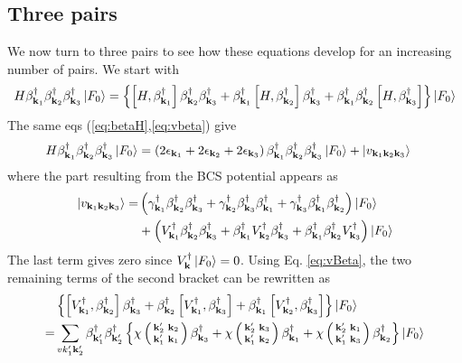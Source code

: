 \documentclass[aps,prb,amsmath,amssymb,preprint,superscriptaddress]{revtex4-1}
\newcommand{\fo}{\ensuremath{\ket{F_0}}}
\begin{document}
\subsection{Three pairs}
We now turn to three pairs to see how these equations develop for an increasing number of pairs. We start with 
\begin{equation}\label{eq:SchThree}
\begin{split}
H\beta^{\dagger}_{\vk_1}\beta^{\dagger}_{\vk_2}\beta^{\dagger}_{\vk_3}\fo
&=\bbr{\com{H}{\beta^{\dagger}_{\vk_1}}\beta^{\dagger}_{\vk_2}\beta^{\dagger}_{\vk_3}+\beta^{\dagger}_{\vk_1}\com{H}{\beta^{\dagger}_{\vk_2}}\beta^{\dagger}_{\vk_3}+\beta^{\dagger}_{\vk_1}\beta^{\dagger}_{\vk_2}\com{H}{\beta^{\dagger}_{\vk_3}}}\fo\\
\end{split}
\end{equation}
The same eqs  (\ref{eq:betaH},\ref{eq:vbeta}) give
\begin{equation}\label{eq:SchThree2}
\begin{split}
H\beta^{\dagger}_{\vk_1}\beta^{\dagger}_{\vk_2}\beta^{\dagger}_{\vk_3}\fo
&=\br{2\epsilon_{\vk_1}+2\epsilon_{\vk_2}+2\epsilon_{\vk_3}}\beta^{\dagger}_{\vk_1}\beta^{\dagger}_{\vk_2}\beta^{\dagger}_{\vk_3}\fo+\ket{v_{\vk_1\vk_2\vk_3}}
\end{split}
\end{equation}
where the part resulting from  the BCS potential appears as 
\begin{equation}\label{eq:vThree}
\begin{split}
\ket{v_{\vk_1\vk_2\vk_3}}=
&\br{\gamma^{\dagger}_{\vk_1}\beta^{\dagger}_{\vk_2}\beta^{\dagger}_{\vk_3}+\gamma^{\dagger}_{\vk_2}\beta^{\dagger}_{\vk_3}\beta^{\dagger}_{\vk_1}+\gamma^{\dagger}_{\vk_3}\beta^{\dagger}_{\vk_1}\beta^{\dagger}_{\vk_2}}\fo\\
&+\br{V^{\dagger}_{\vk_1}\beta^{\dagger}_{\vk_2}\beta^{\dagger}_{\vk_3}+\beta^{\dagger}_{\vk_1}V^{\dagger}_{\vk_2}\beta^{\dagger}_{\vk_3}+\beta^{\dagger}_{\vk_1}\beta^{\dagger}_{\vk_2}V^{\dagger}_{\vk_3}}\fo
\end{split}
\end{equation}
The last term  gives zero since $V^{\dagger}_\vk\fo=0$.  Using Eq. \eqref{eq:vBeta}, the two remaining terms of the second bracket can be rewritten as 
\begin{equation}\label{eq:vThree2}
\begin{split}
&\bbr{\com{V^{\dagger}_{\vk_1}}{\beta^{\dagger}_{\vk_2}}\beta^{\dagger}_{\vk_3}+\beta^{\dagger}_{\vk_2}\com{V^{\dagger}_{\vk_1}}{\beta^{\dagger}_{\vk_3}}+\beta^{\dagger}_{\vk_1}\com{V^{\dagger}_{\vk_2}}{\beta^{\dagger}_{\vk_3}}}\fo\\
=&\sum_{vk'_1\vk'_2}\beta^{\dagger}_{\vk'_1}\beta^{\dagger}_{\vk'_2}
\bbr{\chi\fmtrx{\vk'_2}{\vk_2}{\vk'_1}{\vk_1}\beta^{\dagger}_{\vk_3}+\chi\fmtrx{\vk'_2}{\vk_3}{\vk'_1}{\vk_2}\beta^{\dagger}_{\vk_1}+\chi\fmtrx{\vk'_2}{\vk_1}{\vk'_1}{\vk_3}\beta^{\dagger}_{\vk_2}}\fo
\end{split}
\end{equation}
\end{document}
